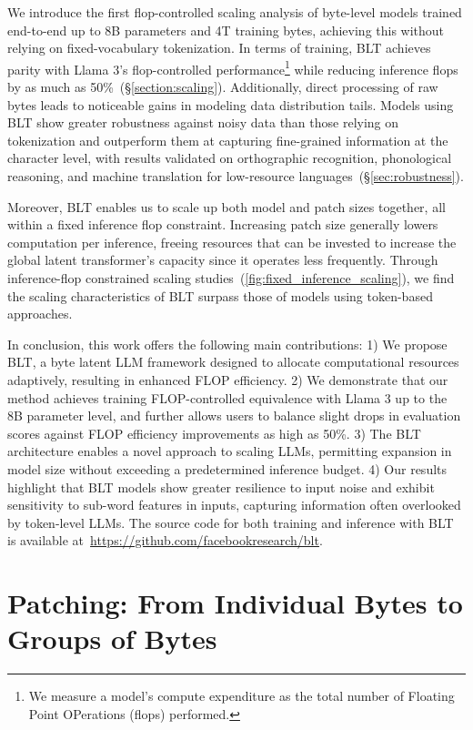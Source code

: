 We introduce the first flop-controlled scaling analysis of byte-level models trained end-to-end up to 8B parameters and 4T training bytes, achieving this without relying on fixed-vocabulary tokenization. In terms of training, {\textsc BLT} achieves parity with Llama 3’s flop-controlled performance\footnote{We measure a model’s compute expenditure as the total number of Floating Point OPerations (flops) performed.} while reducing inference flops by as much as 50\%~(\S\ref{section:scaling}). Additionally, direct processing of raw bytes leads to noticeable gains in modeling data distribution tails. Models using {\textsc BLT} show greater robustness against noisy data than those relying on tokenization and outperform them at capturing fine-grained information at the character level, with results validated on orthographic recognition, phonological reasoning, and machine translation for low-resource languages~(\S\ref{sec:robustness}). 

Moreover, {\textsc BLT} enables us to scale up both model and patch sizes together, all within a fixed inference flop constraint. Increasing patch size generally lowers computation per inference, freeing resources that can be invested to increase the global latent transformer’s capacity since it operates less frequently. Through inference-flop constrained scaling studies~(\autoref{fig:fixed_inference_scaling}), we find the scaling characteristics of {\textsc BLT} surpass those of models using token-based approaches.

In conclusion, this work offers the following main contributions: 1) We propose {\textsc BLT}, a byte latent LLM framework designed to allocate computational resources adaptively, resulting in enhanced FLOP efficiency. 2) We demonstrate that our method achieves training FLOP-controlled equivalence with Llama 3 up to the 8B parameter level, and further allows users to balance slight drops in evaluation scores against FLOP efficiency improvements as high as 50\%. 3) The {\textsc BLT} architecture enables a novel approach to scaling LLMs, permitting expansion in model size without exceeding a predetermined inference budget. 4) Our results highlight that {\textsc BLT} models show greater resilience to input noise and exhibit sensitivity to sub-word features in inputs, capturing information often overlooked by token-level LLMs. The source code for both training and inference with {\textsc BLT} is available at~\url{https://github.com/facebookresearch/blt}.

\section{Patching: From Individual Bytes to Groups of Bytes}
\label{section:patching}

